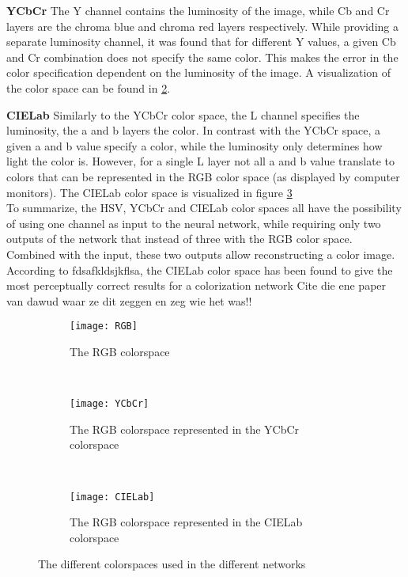 \textbf{YCbCr} The Y channel contains the luminosity of the image, while Cb and Cr layers are the chroma blue and chroma red layers respectively. While providing a separate luminosity channel, it was found that for different Y values, a given Cb and Cr combination does not specify the same color. This makes the error in the color specification dependent on the luminosity of the image. A visualization of the color space can be found in \ref{fig:YCbCr}.

\textbf{CIELab} Similarly to the YCbCr color space, the L channel specifies the luminosity, the a and b layers the color. In contrast with the YCbCr space, a given a and b value specify a color, while the luminosity only determines how light the color is. However, for a single L layer not all a and b value translate to colors that can be represented in the RGB color space (as displayed by computer monitors). The CIELab color space is visualized in figure \ref{fig:CIELab}\\

To summarize, the HSV, YCbCr and CIELab color spaces all have the possibility of using one channel as input to the neural network, while requiring only two outputs of the network that instead of three with the RGB color space. Combined with the input, these two outputs allow reconstructing a color image. According to {\color{red}fdsafkldsjkflsa}, the CIELab color space has been found to give the most perceptually correct results for a colorization network {\color{red} Cite die ene paper van dawud waar ze dit zeggen en zeg wie het was!!}\\

\begin{figure}
	\centering
	\begin{subfigure}[b]{0.32\textwidth}
		\texttt{[image: RGB]}
		\caption{The RGB colorspace}
		\label{fig:RGB}
	\end{subfigure}
	~ %
	\begin{subfigure}[b]{0.32\textwidth}
		\texttt{[image: YCbCr]}
		\caption{The RGB colorspace represented in the YCbCr colorspace}
		\label{fig:YCbCr}
	\end{subfigure}
	~ %
	\begin{subfigure}[b]{0.32\textwidth}
		\texttt{[image: CIELab]}
		\caption{The RGB colorspace represented in the CIELab colorspace}
		\label{fig:CIELab}
	\end{subfigure}
	\caption{The different colorspaces used in the different networks}\label{fig:animals}
\end{figure}


